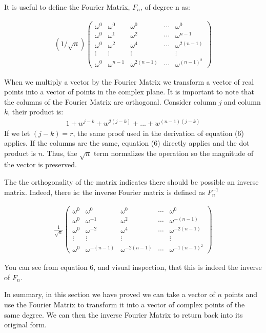 \documentclass[DIV=calc, paper=a4, fontsize=11pt, twocolumn]{scrartcl}   %
\begin{document}
It is useful to define the Fourier Matrix, $F_{n}$, of degree n as:

\begin{align}
 (1/\sqrt n)
 \begin{pmatrix}
  \omega^0 & \omega^0 & \omega^0 & \cdots & \omega^0 \\
  \omega^0  & \omega^1 & \omega^2 &  \cdots &  \omega^{n-1} \\
   \omega^0  & \omega^2 & \omega^4 &  \cdots &  \omega^{2(n-1)} \\
  \vdots  & \vdots  & \vdots &   & \vdots  \\
  \omega^0  & \omega^{n-1} & \omega^{2(n-1)} & \cdots & \omega^{{(n-1)}^2}
 \end{pmatrix}
\end{align}

When we multiply a vector by the Fourier Matrix we transform a vector of real points into a vector of points in the complex plane. It is important to note that the columns of the Fourier Matrix are orthogonal. Consider column $j$ and column $k$, their product is:
\begin{align}
1 + w^{j-k} +w^{2(j-k)}+...+w^{(n-1)(j-k)}
\end{align}
If we let $(j-k) = r$, the same proof used in the derivation of equation (6) applies. If the columns are the same, equation (6) directly applies and the dot product is $n$. Thus, the $\sqrt{n}$ term normalizes the operation so the magnitude of the vector is preserved.
\par The the orthogonality of the matrix indicates there should be possible an inverse matrix. Indeed, there is: the inverse Fourier matrix is defined as $F_{n}^{-1}$

\begin{align}
\frac{1}{\sqrt n}
 \begin{pmatrix}
  \omega^0 & \omega^0 & \omega^0 & \cdots & \omega^0 \\
  \omega^0  & \omega^{-1} & \omega^2 &  \cdots &  \omega^{-(n-1)} \\
   \omega^0  & \omega^{-2} & \omega^4 &  \cdots &  \omega^{-2(n-1)} \\
  \vdots  & \vdots  & \vdots &   & \vdots  \\
  \omega^0  & \omega^{-(n-1)} & \omega^{-2(n-1)} & \cdots & \omega^{{-1(n-1)}^2}
 \end{pmatrix}
\end{align}

You can see from equation 6, and visual inspection, that this is indeed the inverse of $F_{n}$.
\par In summary, in this section we have proved we can take a vector of $n$ points and use the Fourier Matrix to transform it into a vector of complex points of the same degree. We can then the inverse Fourier Matrix to return back into its original form.
\end{document}
